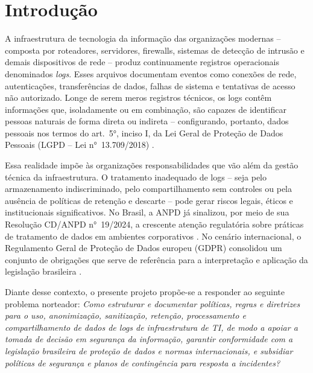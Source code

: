 
\chapter{Introdução}
\label{cap:introducao}

A infraestrutura de tecnologia da informação das organizações modernas -- composta por roteadores, servidores, firewalls, sistemas de detecção de intrusão e demais dispositivos de rede -- produz continuamente registros operacionais denominados \textit{logs}. Esses arquivos documentam eventos como conexões de rede, autenticações, transferências de dados, falhas de sistema e tentativas de acesso não autorizado. Longe de serem meros registros técnicos, os logs contêm informações que, isoladamente ou em combinação, são capazes de identificar pessoas naturais de forma direta ou indireta -- configurando, portanto, dados pessoais nos termos do art.\ 5°, inciso I, da Lei Geral de Proteção de Dados Pessoais (LGPD -- Lei n°~13.709/2018) \cite{brasil2018lgpd}.

Essa realidade impõe às organizações responsabilidades que vão além da gestão técnica da infraestrutura. O tratamento inadequado de logs -- seja pelo armazenamento indiscriminado, pelo compartilhamento sem controles ou pela ausência de políticas de retenção e descarte -- pode gerar riscos legais, éticos e institucionais significativos. No Brasil, a ANPD já sinalizou, por meio de sua Resolução CD/ANPD n°~19/2024, a crescente atenção regulatória sobre práticas de tratamento de dados em ambientes corporativos \cite{anpd2024resolucao}. No cenário internacional, o Regulamento Geral de Proteção de Dados europeu (GDPR) consolidou um conjunto de obrigações que serve de referência para a interpretação e aplicação da legislação brasileira \cite{gdpr2016}.

Diante desse contexto, o presente projeto propõe-se a responder ao seguinte problema norteador: \textit{Como estruturar e documentar políticas, regras e diretrizes para o uso, anonimização, sanitização, retenção, processamento e compartilhamento de dados de logs de infraestrutura de TI, de modo a apoiar a tomada de decisão em segurança da informação, garantir conformidade com a legislação brasileira de proteção de dados e normas internacionais, e subsidiar políticas de segurança e planos de contingência para resposta a incidentes?}

